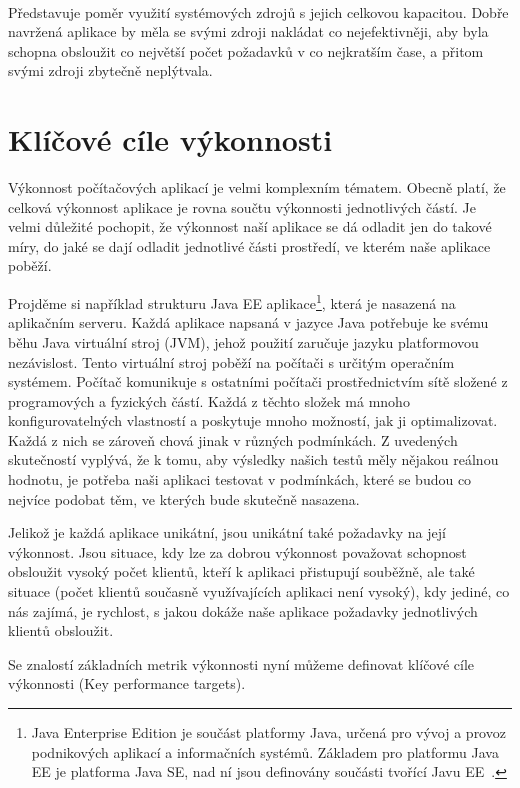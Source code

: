 \documentclass[122pt,oneside]{fithesis}
\begin{document}
\vspace{5 mm}
\\\indent Představuje poměr využití systémových zdrojů s jejich celkovou kapacitou. Dobře navržená aplikace by měla se svými zdroji nakládat co nejefektivněji, aby byla schopna obsloužit co největší počet požadavků v co nejkratším čase, a přitom svými zdroji zbytečně neplýtvala.

\section{Klíčové cíle výkonnosti}
Výkonnost počítačových aplikací je velmi komplexním tématem. Obecně platí, že celková výkonnost aplikace je rovna součtu výkonnosti jednotlivých částí. Je velmi důležité pochopit, že výkonnost naší aplikace se dá odladit jen do takové míry, do jaké se dají odladit jednotlivé části prostředí, ve kterém naše aplikace poběží. 

Projděme si například strukturu Java EE aplikace\footnote{Java Enterprise Edition je součást platformy Java, určená pro vývoj a provoz podnikových aplikací a informačních systémů. Základem pro platformu Java EE je platforma Java SE, nad ní jsou definovány součásti tvořící Javu EE~\cite{wikiJavaEE}.}, která je nasazená na aplikačním serveru. Každá aplikace napsaná v jazyce Java potřebuje ke svému běhu Java virtuální stroj (JVM), jehož použití zaručuje jazyku platformovou nezávislost. Tento virtuální stroj poběží na počítači s určitým operačním systémem. Počítač komunikuje s ostatními počítači prostřednictvím sítě složené z programových a fyzických částí. Každá z těchto složek má mnoho konfigurovatelných vlastností a poskytuje mnoho možností, jak ji optimalizovat. Každá z nich se zároveň chová jinak v různých podmínkách. Z uvedených skutečností vyplývá, že k tomu, aby výsledky našich testů měly nějakou reálnou hodnotu, je potřeba naši aplikaci testovat v podmínkách, které se budou co nejvíce podobat těm, ve kterých bude skutečně nasazena.

Jelikož je každá aplikace unikátní, jsou unikátní také požadavky na její výkonnost. Jsou situace, kdy lze za dobrou výkonnost považovat schopnost obsloužit vysoký počet klientů, kteří k aplikaci přistupují souběžně, ale také situace (počet klientů současně využívajících aplikaci není vysoký), kdy jediné, co nás zajímá, je rychlost, s jakou dokáže naše aplikace požadavky jednotlivých klientů obsloužit.
 
Se znalostí základních metrik výkonnosti nyní můžeme definovat klíčové cíle výkonnosti (Key performance targets).
\end{document}
